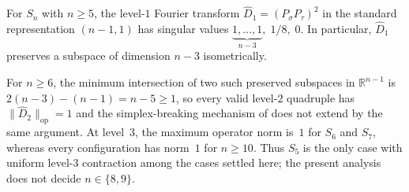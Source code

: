 \documentclass[version=final]{iacrcc}
\newcommand{\norm}[1]{\lVert #1 \rVert}
\newcommand{\opn}[1]{\norm{#1}_{\mathrm{op}}}
\newcommand{\Dhat}{\widehat{D}}
\begin{document}
\begin{theorem}
\label{thm:dim-obstruction}
For $S_n$ with $n \geq 5$, the level-$1$ Fourier transform
$\Dhat_1 = (P_\sigma P_\tau)^2$ in the standard representation $(n-1,1)$
has singular values $\underbrace{1, \ldots, 1}_{n-3},\; 1/8,\; 0$.
In particular, $\Dhat_1$ preserves a subspace of dimension $n-3$ isometrically.

For $n \geq 6$, the minimum intersection of two such preserved subspaces
in $\mathbb{R}^{n-1}$ is $2(n-3)-(n-1) = n-5 \geq 1$, so every valid level-$2$
quadruple has $\opn{\Dhat_2} = 1$ and the simplex-breaking mechanism of
 does not extend by the same argument. At level~$3$, the
maximum operator norm is~$1$ for $S_6$ and $S_7$, whereas every configuration
has norm~$1$ for $n \geq 10$. Thus $S_5$ is the only case with uniform
level-$3$ contraction among the cases settled here; the present analysis does
not decide $n \in \{8,9\}$.
\end{theorem}
\end{document}
